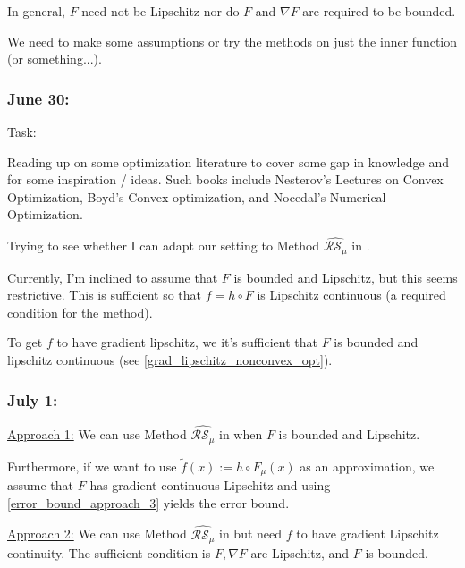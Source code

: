 \documentclass{article}
\begin{document}
In general, $F$ need not be Lipschitz nor do $F$ and $\nabla F$ are required to be bounded. \newline 

We need to make some assumptions or try the methods on just the inner function (or something...).

\subsubsection{June 30:}

Task: \newline 

Reading up on some optimization literature to cover some gap in knowledge and for some inspiration / ideas. Such books include Nesterov's Lectures on Convex Optimization, Boyd's Convex optimization, and Nocedal's Numerical Optimization.  \newline

Trying to see whether I can adapt our setting to Method $\widehat{\mathcal{R}\mathcal{S}_{\mu}}$ in \cite{Nesterov2015}. \newline 

Currently, I'm inclined to assume that $F$ is bounded and Lipschitz, but this seems restrictive. This is sufficient so that $f = h \circ F$ is Lipschitz continuous (a required condition for the method). \newline

To get $f$ to have gradient lipschitz, we it's sufficient that $F$ is bounded and lipschitz continuous (see \eqref{grad_lipschitz_nonconvex_opt}).

\subsubsection{July 1:}

\underline{Approach 1:} We can use Method $\widehat{\mathcal{R}\mathcal{S}_{\mu}}$ in \cite{Nesterov2015} when $F$ is bounded and Lipschitz. \newline 

Furthermore, if we want to use $\tilde{f}(x):= h \circ F_{\mu}(x)$ as an approximation, we assume that $F$ has gradient continuous Lipschitz and using \eqref{error_bound_approach_3} yields the error bound. \newline 

\underline{Approach 2:} We can use Method $\widehat{\mathcal{R}\mathcal{S}_{\mu}}$ in \cite{Nesterov2015} but need $f$ to have gradient Lipschitz continuity. The sufficient condition is $F, \nabla F$ are Lipschitz, and $F$ is bounded. \newline 
\end{document}
